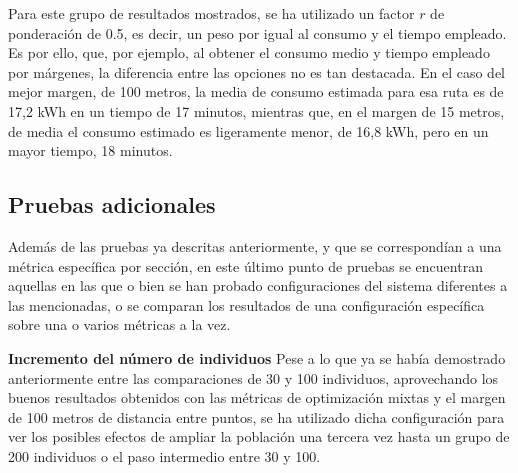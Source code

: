 \documentclass[11pt,spanish,listoffigures,listoftables]{tfgetsinf}
\begin{document}
Para este grupo de resultados mostrados, se ha utilizado un factor $r$ de ponderación de 0.5, es decir, un peso por igual al consumo y el tiempo empleado. Es por ello, que, por ejemplo, al obtener el consumo medio y tiempo empleado por márgenes, la diferencia entre las opciones no es tan destacada. En el caso del mejor margen, de 100 metros, la media de consumo estimada para esa ruta es de 17,2 kWh en un tiempo de 17 minutos, mientras que, en el margen de 15 metros, de media el consumo estimado es ligeramente menor, de 16,8 kWh, pero en un mayor tiempo, 18 minutos.

\newpage
\subsection{Pruebas adicionales}
Además de las pruebas ya descritas anteriormente, y que se correspondían a una métrica específica por sección, en este último punto de pruebas se encuentran aquellas en las que o bien se han probado configuraciones del sistema diferentes a las mencionadas, o se comparan los resultados de una configuración específica sobre una o varios métricas a la vez.\newline

\textbf{Incremento del número de individuos}\newline
Pese a lo que ya se había demostrado anteriormente entre las comparaciones de 30 y 100 individuos, aprovechando los buenos resultados obtenidos con las métricas de optimización mixtas y el margen de 100 metros de distancia entre puntos, se ha utilizado dicha configuración para ver los posibles efectos de ampliar la población una tercera vez hasta un grupo de 200 individuos o el paso intermedio entre 30 y 100.
\end{document}
